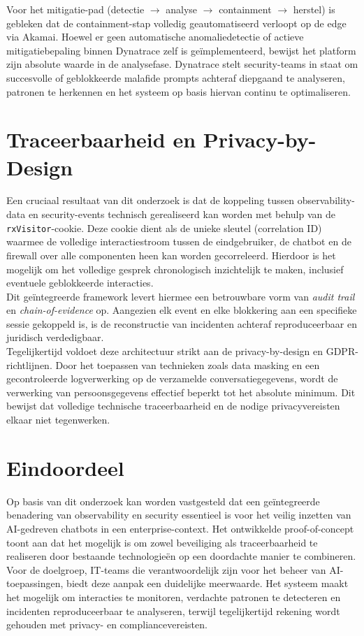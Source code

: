 Voor het mitigatie-pad (detectie $\rightarrow$ analyse $\rightarrow$ containment $\rightarrow$ herstel) is gebleken dat de containment-stap volledig geautomatiseerd verloopt op de edge via Akamai. Hoewel er geen automatische anomaliedetectie of actieve mitigatiebepaling binnen Dynatrace zelf is geïmplementeerd, bewijst het platform zijn absolute waarde in de analysefase. Dynatrace stelt security-teams in staat om succesvolle of geblokkeerde malafide prompts achteraf diepgaand te analyseren, patronen te herkennen en het systeem op basis hiervan continu te optimaliseren.

\section{Traceerbaarheid en Privacy-by-Design}

Een cruciaal resultaat van dit onderzoek is dat de koppeling tussen observability-data en security-events technisch gerealiseerd kan worden met behulp van de \texttt{rxVisitor}-cookie. Deze cookie dient als de unieke sleutel (correlation ID) waarmee de volledige interactiestroom tussen de eindgebruiker, de chatbot en de firewall over alle componenten heen kan worden gecorreleerd. Hierdoor is het mogelijk om het volledige gesprek chronologisch inzichtelijk te maken, inclusief eventuele geblokkeerde interacties.\\

Dit geïntegreerde framework levert hiermee een betrouwbare vorm van \textit{audit trail} en \textit{chain-of-evidence} op. Aangezien elk event en elke blokkering aan een specifieke sessie gekoppeld is, is de reconstructie van incidenten achteraf reproduceerbaar en juridisch verdedigbaar.\\

Tegelijkertijd voldoet deze architectuur strikt aan de privacy-by-design en GDPR-richtlijnen. Door het toepassen van technieken zoals data masking en een gecontroleerde logverwerking op de verzamelde conversatiegegevens, wordt de verwerking van persoonsgegevens effectief beperkt tot het absolute minimum. Dit bewijst dat volledige technische traceerbaarheid en de nodige privacyvereisten elkaar niet tegenwerken.

\section{Eindoordeel}

Op basis van dit onderzoek kan worden vastgesteld dat een geïntegreerde benadering van observability en security essentieel is voor het veilig inzetten van AI-gedreven chatbots in een enterprise-context. Het ontwikkelde proof-of-concept toont aan dat het mogelijk is om zowel beveiliging als traceerbaarheid te realiseren door bestaande technologieën op een doordachte manier te combineren.\\

Voor de doelgroep, IT-teams die verantwoordelijk zijn voor het beheer van AI-toepassingen, biedt deze aanpak een duidelijke meerwaarde. Het systeem maakt het mogelijk om interacties te monitoren, verdachte patronen te detecteren en incidenten reproduceerbaar te analyseren, terwijl tegelijkertijd rekening wordt gehouden met privacy- en compliancevereisten.\\
